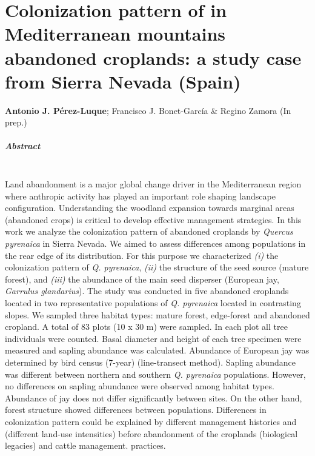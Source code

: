 %
\chapter{\textcolor{ctcolormain}{Colonization pattern of \Qp in Mediterranean mountains abandoned croplands: a study case from Sierra Nevada (Spain)}}\label{sec:coloniza}




\mbox{}
\vfill
{\color{ctcolormain}\textbf{Antonio J. Pérez-Luque}}; Francisco J. Bonet-García \& Regino Zamora (In prep.)


\newpage

\paragraph{Abstract} \mbox{} \\
Land abandonment is a major global change driver in the Mediterranean region where anthropic activity has played an important role shaping landscape configuration. Understanding the woodland expansion towards marginal areas (abandoned crops) is critical to develop effective management strategies. In this work we analyze the colonization pattern of abandoned croplands by \emph{Quercus pyrenaica} in Sierra Nevada. We aimed to assess differences among populations in the rear edge of its distribution. For this purpose we characterized \emph{(i)} the colonization pattern of \emph{Q. pyrenaica}, \emph{(ii)} the structure of the seed source (mature forest), and \emph{(iii)} the abundance of the main seed disperser (European jay, \emph{Garrulus glandarius}). The study was conducted in five abandoned croplands located in two representative populations of \emph{Q. pyrenaica} located in contrasting slopes. We sampled three habitat types: mature forest, edge-forest and abandoned cropland. A total of 83 plots (10 x 30 m) were sampled. In each plot all tree individuals were counted. Basal diameter and height of each tree specimen were measured and sapling abundance was calculated. Abundance of European jay was determined by bird census (7-year) (line-transect method). Sapling abundance was different between northern and southern \emph{Q. pyrenaica} populations. However, no differences on sapling abundance were observed among habitat types. Abundance of jay does not differ significantly between sites. On the other hand, forest structure showed differences between populations. Differences in colonization pattern could be explained by different management histories and (different land-use intensities) before abandonment of the croplands (biological legacies) and cattle management. 
practices.

